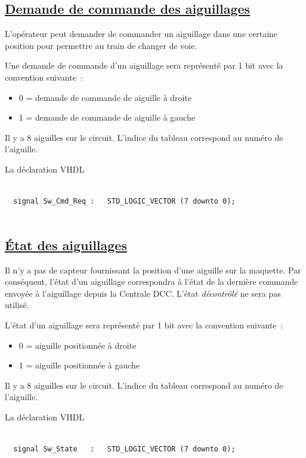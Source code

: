 \subsection{\underline{Demande de commande des aiguillages}}
\label{sec:ixl_dem_aig}

L'opérateur peut demander de commander un aiguillage dans une certaine
position pour permettre au train de changer de voie.

Une demande de commande d'un aiguillage sera représenté par
1 bit avec la convention suivante~:
\begin{itemize}
\item 0 = demande de commande de aiguille à droite
\item 1 = demande de commande de aiguille à gauche
\end{itemize}
 
Il y a 8 aiguilles sur le circuit. L'indice du tableau correspond au
numéro de l'aiguille.

\medskip
La déclaration VHDL
\begin{lstlisting}[style=vhdl]
  
  signal Sw_Cmd_Req :   STD_LOGIC_VECTOR (7 downto 0);
  
\end{lstlisting}


\subsection{\underline{\'Etat des aiguillages}}
\label{sec:ixl_aig}

Il n'y a pas de capteur fournissant la position d'une aiguille sur la
maquette.  Par conséquent, l'état d'un aiguillage correspondra à l'état
de la dernière commande envoyée à l'aiguillage depuis la Centrale DCC.
L'état \emph{décontrôlé} ne sera pas utilisé.
 
L'état d'un aiguillage sera représenté par 1 bit avec la convention
suivante~:
\begin{itemize}
\item 0 = aiguille positionnée à droite
\item 1 = aiguille positionnée à gauche
\end{itemize}
 
Il y a 8 aiguilles sur le circuit. L'indice du tableau correspond au
numéro de l'aiguille.

\medskip
La déclaration VHDL
\begin{lstlisting}[style=vhdl]

  signal Sw_State   :   STD_LOGIC_VECTOR (7 downto 0);
  
\end{lstlisting}


